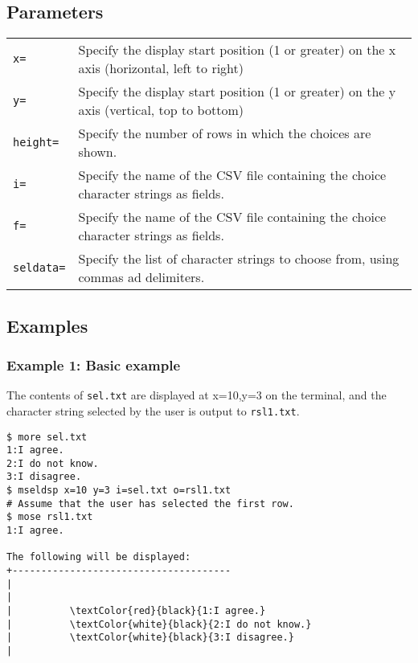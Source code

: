 \subsection*{Parameters}
\begin{table}[htbp]
{\small
\begin{tabular}{ll}
\verb|x=|   & Specify the display start position (1 or greater) on the x axis (horizontal, left to right)\\
\verb|y=|   & Specify the display start position (1 or greater) on the y axis (vertical, top to bottom)\\
\verb|height=| & Specify the number of rows in which the choices are shown.\\
\verb|i=|   & Specify the name of the CSV file containing the choice character strings as fields.\\
\verb|f=|   & Specify the name of the CSV file containing the choice character strings as fields.\\
\verb|seldata=| & Specify the list of character strings to choose from, using commas ad delimiters.\\
\end{tabular} 
}
\end{table} 

\subsection*{Examples}

\subsubsection*{Example 1: Basic example}
The contents of \verb|sel.txt| are displayed at x=10,y=3 on the terminal, and the character string selected by the user is output to \verb|rsl1.txt|.

\begin{Verbatim}[baselinestretch=0.7,frame=single]
$ more sel.txt
1:I agree.
2:I do not know.
3:I disagree.
$ mseldsp x=10 y=3 i=sel.txt o=rsl1.txt
# Assume that the user has selected the first row.
$ mose rsl1.txt
1:I agree.

The following will be displayed:
+--------------------------------------
|
|
|          \textColor{red}{black}{1:I agree.}
|          \textColor{white}{black}{2:I do not know.}
|          \textColor{white}{black}{3:I disagree.}
|
\end{Verbatim}


